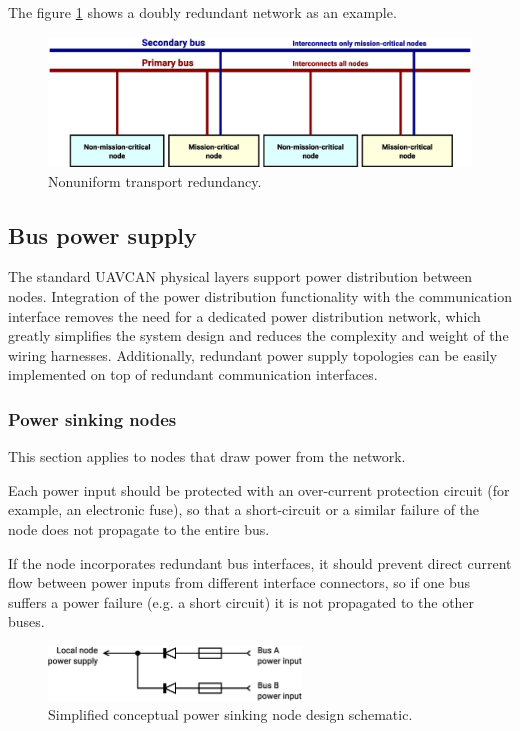 The figure \ref{fig:phy_nonuniform_transport_redundancy} shows a doubly redundant network as an example.

\begin{figure}[H]
    \centering
	\includegraphics[width=\textwidth]{physical_layer/nonuniform_bus_redundancy}
	\caption{Nonuniform transport redundancy.\label{fig:phy_nonuniform_transport_redundancy}}
\end{figure}

\subsection{Bus power supply}

The standard UAVCAN physical layers support power distribution between nodes.
Integration of the power distribution functionality with the communication interface
removes the need for a dedicated power distribution network,
which greatly simplifies the system design and reduces the complexity and weight of the wiring harnesses.
Additionally, redundant power supply topologies can be easily implemented on top of redundant communication interfaces.

\subsubsection{Power sinking nodes}

This section applies to nodes that draw power from the network.

Each power input should be protected with an over-current protection circuit (for example, an electronic fuse),
so that a short-circuit or a similar failure of the node does not propagate to the entire bus.

If the node incorporates redundant bus interfaces,
it should prevent direct current flow between power inputs from different interface connectors,
so if one bus suffers a power failure (e.g. a short circuit) it is not propagated to the other buses.

\begin{figure}[H]
    \centering
	\includegraphics[width=0.6\textwidth]{physical_layer/redundant_bus_power_sink}
	\caption{Simplified conceptual power sinking node design schematic.\label{fig:phy_redundant_bus_power_sink}}
\end{figure}


